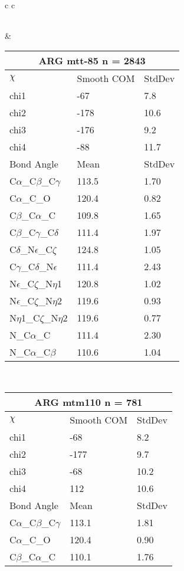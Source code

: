 \begin{longtable}{ c c }
\begin{tabular}{ l l l }
  \bottomrule
  \end{tabular}
  &
  \begin{tabular}{ l l l }
  \toprule
  \multicolumn{3}{c}{ARG \textbf{mtt-85} n = 2843} \\ \toprule
  $\chi$       & Smooth COM & StdDev \\ \midrule
  chi1 & -67 & 7.8 \\ 
  chi2 & -178 & 10.6 \\ 
  chi3 & -176 & 9.2 \\ 
  chi4 & -88 & 11.7 \\ \midrule
  Bond Angle   & Mean     & StdDev \\ \midrule
  C$\alpha$\_C$\beta$\_C$\gamma$ & 113.5 & 1.70\\
  C$\alpha$\_C\_O & 120.4 & 0.82\\
  C$\beta$\_C$\alpha$\_C & 109.8 & 1.65\\
  C$\beta$\_C$\gamma$\_C$\delta$ & 111.4 & 1.97\\
  C$\delta$\_N$\epsilon$\_C$\zeta$ & 124.8 & 1.05\\
  C$\gamma$\_C$\delta$\_N$\epsilon$ & 111.4 & 2.43\\
  N$\epsilon$\_C$\zeta$\_N$\eta$1 & 120.8 & 1.02\\
  N$\epsilon$\_C$\zeta$\_N$\eta$2 & 119.6 & 0.93\\
  N$\eta$1\_C$\zeta$\_N$\eta$2 & 119.6 & 0.77\\
  N\_C$\alpha$\_C & 111.4 & 2.30\\
  N\_C$\alpha$\_C$\beta$ & 110.6 & 1.04\\
  \bottomrule
  \end{tabular}
  \\
  \begin{tabular}{ l l l }
  \toprule
  \multicolumn{3}{c}{ARG \textbf{mtm110} n = 781} \\ \toprule
  $\chi$       & Smooth COM & StdDev \\ \midrule
  chi1 & -68 & 8.2 \\ 
  chi2 & -177 & 9.7 \\ 
  chi3 & -68 & 10.2 \\ 
  chi4 & 112 & 10.6 \\ \midrule
  Bond Angle   & Mean     & StdDev \\ \midrule
  C$\alpha$\_C$\beta$\_C$\gamma$ & 113.1 & 1.81\\
  C$\alpha$\_C\_O & 120.4 & 0.90\\
  C$\beta$\_C$\alpha$\_C & 110.1 & 1.76\\

\end{tabular}
\end{longtable}
